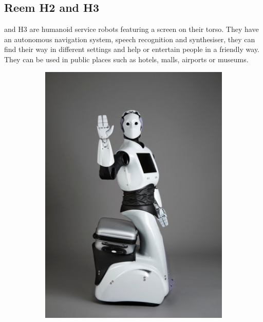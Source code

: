\subsection{Reem H2 and H3}
  and H3  are humanoid service robots featuring a screen on their torso.
They have an autonomous navigation system, speech recognition and synthesiser, they can find their way in different settings and help or entertain people in a friendly way.
They can be used in public places such as hotels, malls, airports or museums.

\begin{figure}
   \centering
   \begin{subfigure}[b]{0.5\textwidth}
       \includegraphics{figures/reemh2}
       \caption{}
       \label{fig:reemh2}
    \end{subfigure}%
       ~ %

\end{figure}
